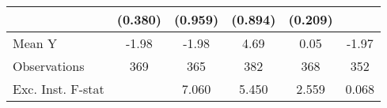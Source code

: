 {\begin{tabular}{l*{5}{c}}
            &     (0.380)         &     (0.959)         &     (0.894)         &     (0.209)         &                     \\
\midrule
Mean Y      &       -1.98         &       -1.98         &        4.69         &        0.05         &       -1.97         \\
Observations&         369         &         365         &         382         &         368         &         352         \\
Exc. Inst. F-stat&                     &       7.060         &       5.450         &       2.559         &       0.068         \\
\bottomrule
\end{tabular}
}

